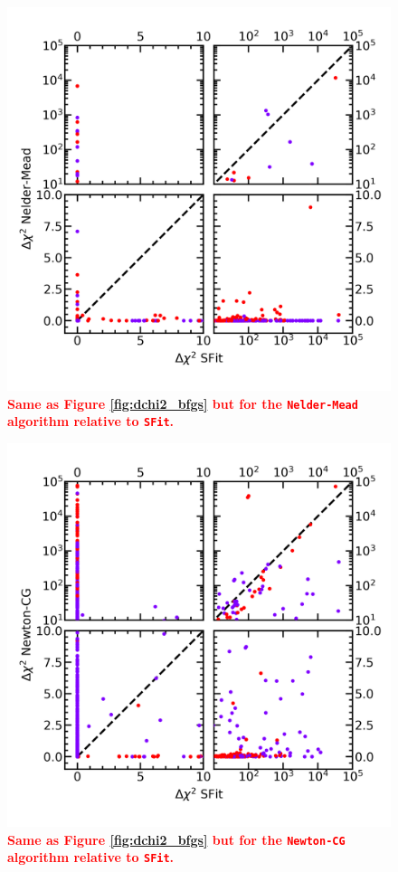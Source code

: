 \documentclass[preprint]{aastex631}
\newcommand{\HL}[1]{\textcolor{red}{\bf#1}}
\newcommand{\neldermead}{\texttt{Nelder-Mead}}
\newcommand{\newtoncg}{\texttt{Newton-CG}}
\newcommand{\sfit}{\texttt{SFit}}
\begin{document}
\begin{figure}
	\begin{centering}
	\includegraphics[height=0.5\textheight]{figs/Dchi2_Nelder-Mead.png}
	\caption{\HL{Same as Figure \ref{fig:dchi2_bfgs} but for the \neldermead\, algorithm relative to \sfit.}
	 \label{fig:dchi2_nm}}
	 \end{centering}
\end{figure}

\begin{figure}
	\begin{centering}
	\includegraphics[height=0.5\textheight]{figs/Dchi2_Newton-CG.png}
	\caption{\HL{Same as Figure \ref{fig:dchi2_bfgs} but for the \newtoncg\, algorithm relative to \sfit.}
	 \label{fig:dchi2_newtoncg}}
	 \end{centering}
\end{figure}
\end{document}
